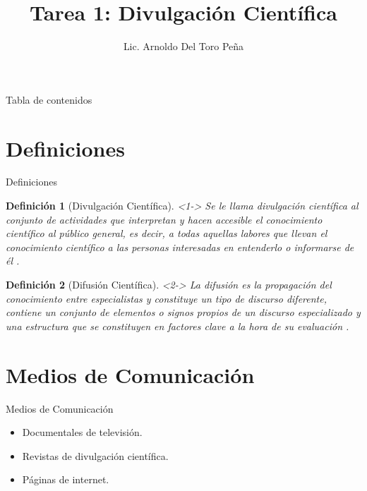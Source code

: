 \documentclass{beamer}
\title{Tarea 1: Divulgación Científica}
\author{Lic. Arnoldo Del Toro Peña }
\institute[UANL]{Universidad Autónoma de Nuevo León}
\newtheorem{definicion}{Definición}
\newcommand{\divul}{Divulgación Científica}
\newcommand{\difu}{Difusión Científica}
\begin{document}
	
	\begin{frame}
		\titlepage
	\end{frame}
	
	\begin{frame}{Tabla de contenidos}
		\tableofcontents
	\end{frame}
	
	\section{Definiciones}
	
	\begin{frame}{Definiciones}
		\begin{definicion}[\divul]<1->
			Se le llama divulgación científica al conjunto de actividades que interpretan y hacen accesible el conocimiento científico al público general, es decir, a todas aquellas labores que llevan el conocimiento científico a las personas interesadas en entenderlo o informarse de él  \citep{fundora_divulgacion_2021}.
		\end{definicion}
	
		\begin{definicion}[\difu]<2->
			La difusión es la propagación del conocimiento entre especialistas y constituye un tipo de discurso diferente, contiene un conjunto de elementos o signos propios de un discurso especializado y una estructura que se constituyen en factores clave a la hora de su evaluación \citep{espinosa_santos_difusion_2010}.
		\end{definicion}
	
	\end{frame} 
	
	\section{Medios de Comunicación}
	
	\begin{frame}{Medios de Comunicación}
		\begin{itemize}
			\item Documentales de televisión. \citep{inti_cine_2021}
			\item Revistas de divulgación científica. \citep{diana_caracteristicas_2021}
			\item Páginas de internet. \citep{noauthor_investigacion_nodate}
		\end{itemize}
	\end{frame}

\end{document}
